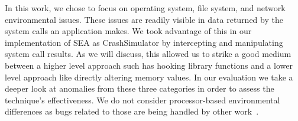 In this work, we chose to focus on operating system,
file system, and network
environmental issues.
These issues are
readily visible in data returned
by the system calls
an application makes.
We took advantage of this in our implementation of SEA as CrashSimulator by
intercepting and manipulating system call results.
As we will discuss, this allowed us to strike a good medium between a
higher level approach such has hooking library functions and a lower level
approach like directly altering memory values.
In our evaluation we take a deeper look at anomalies from
these three categories in order to assess the technique's effectiveness.
We do not consider processor-based environmental differences as bugs related to those are being handled by other
work~\cite{Alglave:2018:FSC:3173162.3177156}.
